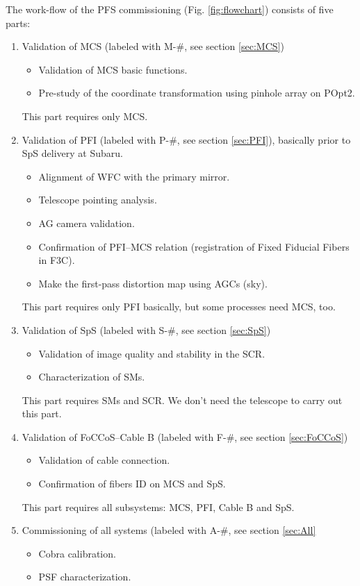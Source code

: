 The work-flow of the PFS commissioning (Fig. \ref{fig:flowchart}) consists of five parts: 
\begin{enumerate}
\item Validation of MCS (labeled with M-\#, see section \ref{sec:MCS})
 \begin{itemize}
 \item Validation of MCS basic functions.
 \item Pre-study of the coordinate transformation using pinhole array on POpt2.
 \end{itemize}
This part requires only MCS.
\item Validation of PFI (labeled with P-\#, see section \ref{sec:PFI}), basically prior to SpS delivery at Subaru.
 \begin{itemize}
 \item Alignment of WFC with the primary mirror.
 \item Telescope pointing analysis.
 \item AG camera validation.
 \item Confirmation of PFI--MCS relation (registration of Fixed Fiducial Fibers in F3C).
 \item Make the first-pass distortion map using AGCs (sky).
 \end{itemize}
This part requires only PFI basically, but some processes need MCS, too.
\item Validation of SpS (labeled with S-\#, see section \ref{sec:SpS})
 \begin{itemize}
 \item Validation of image quality and stability in the SCR.
 \item Characterization of SMs.
 \end{itemize}
This part requires SMs and SCR.
We don't need the telescope to carry out this part.
\item Validation of FoCCoS--Cable B (labeled with F-\#, see section \ref{sec:FoCCoS})
 \begin{itemize}
 \item Validation of cable connection.
 \item Confirmation of fibers ID on MCS and SpS.
 \end{itemize}
This part requires all subsystems: MCS, PFI, Cable B and SpS.
\item Commissioning of all systems (labeled with A-\#, see section \ref{sec:All}
 \begin{itemize}
 \item Cobra calibration.
 \item PSF characterization.

\end{itemize}
\end{enumerate}
